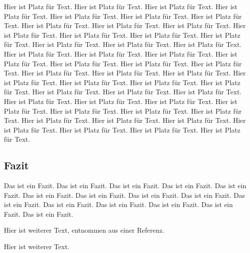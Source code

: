 Hier ist Platz für Text. Hier ist Platz für Text. Hier ist Platz für Text. Hier ist Platz für Text. Hier ist Platz für Text. Hier ist Platz für Text. Hier ist Platz für Text. Hier ist Platz für Text. Hier ist Platz für Text. Hier ist Platz für Text. Hier ist Platz für Text. Hier ist Platz für Text. Hier ist Platz für Text. Hier ist Platz für Text. Hier ist Platz für Text. Hier ist Platz für Text. Hier ist Platz für Text. Hier ist Platz für Text. Hier ist Platz für Text. Hier ist Platz für Text. Hier ist Platz für Text. Hier ist Platz für Text. Hier ist Platz für Text. Hier ist Platz für Text. Hier ist Platz für Text. Hier ist Platz für Text. Hier ist Platz für Text. Hier ist Platz für Text. Hier ist Platz für Text. Hier ist Platz für Text. Hier ist Platz für Text. Hier ist Platz für Text. Hier ist Platz für Text. Hier ist Platz für Text. Hier ist Platz für Text. Hier ist Platz für Text. Hier ist Platz für Text. Hier ist Platz für Text. Hier ist Platz für Text. Hier ist Platz für Text. Hier ist Platz für Text. Hier ist Platz für Text. Hier ist Platz für Text. Hier ist Platz für Text. Hier ist Platz für Text. Hier ist Platz für Text. Hier ist Platz für Text. Hier ist Platz für Text.

\subsection{Fazit}
\label{subsec:01-01-01-conclusion}

Das ist ein Fazit. Das ist ein Fazit. Das ist ein Fazit. Das ist ein Fazit. Das ist ein Fazit. Das ist ein Fazit. Das ist ein Fazit. Das ist ein Fazit. Das ist ein Fazit. Das ist ein Fazit. Das ist ein Fazit. Das ist ein Fazit. Das ist ein Fazit. Das ist ein Fazit. Das ist ein Fazit.

Hier ist weiterer Text, entnommen aus einer Referenz. \cite{000:Reference}

\begin{comment}
\begin{codebox}{python}{Code}
	print('Hello World')
\end{codebox}
\end{comment}

Hier ist weiterer Text.
